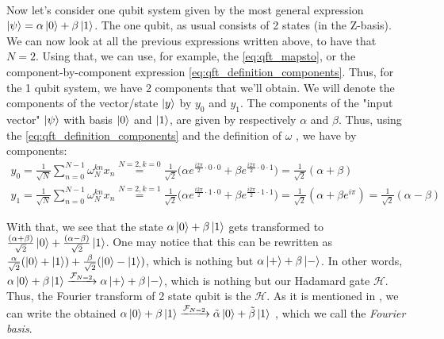 \paragraph{}
Now let's consider one qubit system given by the most general expression $\ket{\psi}=\alpha \ket{0} + \beta \ket{1}$.
The one qubit, as usual consists of 2 states (in the Z-basis). We can now look at all the previous expressions 
written above, to have that $N=2$. Using that, we can use, for example, the \autoref{eq:qft_mapsto}, or the component-by-component 
expression \autoref{eq:qft_definition_components}.
Thus, for the 1 qubit system, we have 2 components that we'll obtain. We will denote the components of the vector/state $\ket{y}$
by $y_0$ and $y_1$. The components of the "input vector" $\ket{\psi}$ with basis $\ket{0}$ and $\ket{1}$, are given by respectively $\alpha$
and $\beta$. Thus, using the \autoref{eq:qft_definition_components} and the definition of $\omega$ , we have by components:
\begin{gather}
  y_0= \frac{1}{\sqrt{N}}\sum_{n=0}^{N-1}\omega_{N}^{kn} x_n \stackrel{N=2, k=0}{=} 
  \frac{1}{\sqrt{2}}\biggl( \alpha e^{\frac{i2\pi}{2}\cdot0\cdot0} + \beta e^{\frac{i2\pi}{2}\cdot 0\cdot 1} \biggr)=
  \frac{1}{\sqrt{2}}(\alpha + \beta )\\
  y_1= \frac{1}{\sqrt{N}}\sum_{n=0}^{N-1}\omega_{N}^{kn} x_n \stackrel{N=2,k=1}{=} 
  \frac{1}{\sqrt{2}}\biggl( \alpha e^{\frac{i2\pi}{2}\cdot1 \cdot0} + \beta e^{\frac{i2\pi}{2}\cdot 1\cdot 1} \biggr)=
  \frac{1}{\sqrt{2}}(\alpha + \beta e^{i\pi})=\frac{1}{\sqrt{2}}(\alpha - \beta) 
\end{gather}

With that, we see that the state $\alpha\ket{0} + \beta\ket{1}$ gets transformed to 
$\frac{(\alpha+\beta)}{\sqrt{2}}\ket{0} + \frac{(\alpha - \beta)}{\sqrt{2}}\ket{1}$.
One may notice that this can be rewritten as 
$\frac{\alpha}{\sqrt{2}}(\ket{0}+\ket{1}) + \frac{\beta}{\sqrt{2}}(\ket{0}-\ket{1})$, which 
is nothing but $\alpha \ket{+} + \beta \ket{-}$. In other words, 
$\alpha \ket{0} + \beta \ket{1} \xrightarrow{\mathcal{F}_{N=2}} \alpha \ket{+} + \beta \ket{-}$, which 
is nothing but our Hadamard gate $\mathcal{H}$. Thus, the Fourier transform of 2 state qubit is 
the $\mathcal{H}$. As it is mentioned in \cite{noauthor_quantum_nodate}, we can write the obtained 
$\alpha \ket{0} + \beta \ket{1} \xrightarrow{\mathcal{F}_{N=2}} \tilde{\alpha} \ket{0} + \tilde{\beta} \ket{1}$
, which we call the \textit{Fourier basis}.

